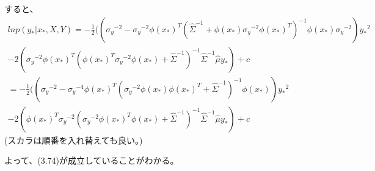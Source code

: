 \documentclass{jsarticle}
\begin{document}
すると、
\begin{equation}
\begin{split}
ln p(y_* | x_*, X, Y)
= -\frac{1}{2}(({\sigma_y}^{-2} - {\sigma_y}^{-2}{\phi(x_*)}^T({\hat{\Sigma}}^{-1} + \phi(x_*) {\sigma_y}^{-2} {\phi(x_*)}^T)^{-1}\phi(x_*){\sigma_y}^{-2}){y_*}^2\\
- 2({\sigma_y}^{-2} {\phi(x_*)}^T ({\phi(x_*)}^T {\sigma_y}^{-2} \phi(x_*) + {\hat{\Sigma}}^{-1})^{-1} {\hat{\Sigma}}^{-1} \hat{\mu} y_*) + c\\
= -\frac{1}{2}(({\sigma_y}^{-2} - {\sigma_y}^{-4}{\phi(x_*)}^T({\sigma_y}^{-2} \phi(x_*) {\phi(x_*)}^T + {\hat{\Sigma}}^{-1})^{-1}\phi(x_*)){y_*}^2\\
- 2({\phi(x_*)}^T {\sigma_y}^{-2} ({\sigma_y}^{-2} {\phi(x_*)}^T \phi(x_*) + {\hat{\Sigma}}^{-1})^{-1} {\hat{\Sigma}}^{-1} \hat{\mu} y_*) + c
\end{split}
\end{equation}
(スカラは順番を入れ替えても良い。)

よって、(3.74)が成立していることがわかる。
\end{document}
